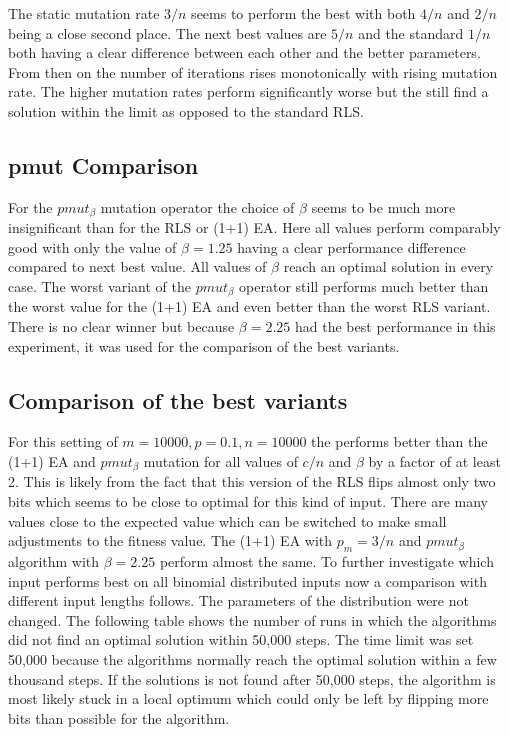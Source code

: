 

The static mutation rate $3/n$ seems to perform the best with both $4/n$ and $2/n$ being a close second place.
The next best values are $5/n$ and the standard $1/n$ both having a clear difference between each other and the better parameters.
From then on the number of iterations rises monotonically with rising mutation rate.
The higher mutation rates perform significantly worse but the still find a solution within the limit as opposed to the standard RLS.
\subsection{pmut Comparison}




For the $pmut_\beta$ mutation operator the choice of $\beta$ seems to be much more insignificant than for the RLS or (1+1) EA. Here all values perform comparably good with only the value of $\beta = 1.25$ having a clear performance difference compared to next best value. All values of $\beta$ reach an optimal solution in every case. The worst variant of the $pmut_\beta$ operator still performs much better than the worst value for the (1+1) EA and even better than the worst RLS variant. There is no clear winner but because $\beta=2.25$ had the best performance in this experiment, it was used for the comparison of the best variants.
\subsection{Comparison of the best variants}




For this setting of $m=10000, p=0.1, n=10000$ the \RLSN[2] performs better than the  (1+1) EA and $pmut_\beta$ mutation for all values of $c/n$ and $\beta$ by a factor of at least 2.
This is likely from the fact that this version of the RLS flips almost only two bits which seems to be close to optimal for this kind of input.
There are many values close to the expected value which can be switched to make small adjustments to the fitness value.
The (1+1) EA with $p_m=3/n$ and $pmut_\beta$ algorithm with $\beta=2.25$ perform almost the same.
To further investigate which input performs best on all binomial distributed inputs now a comparison with different input lengths follows.
The parameters of the distribution were not changed.\newline
The following table shows the number of runs in which the algorithms did not find an optimal solution within 50,000 steps.
The time limit was set 50,000 because the algorithms normally reach the optimal solution within a few thousand steps.
If the solutions is not found after 50,000 steps, the algorithm is most likely stuck in a local optimum which could only be left by flipping more bits than possible for the algorithm.

